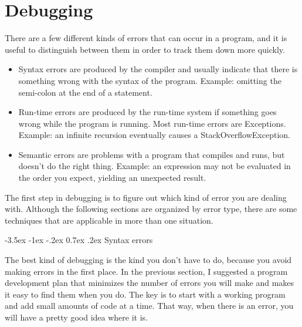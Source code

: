 \documentclass{book}
\makeatletter
\newcounter{exercisenum}
\renewcommand{\section}{\@startsection 
    {section} {1} {0mm}%
    {-3.5ex \@plus -1ex \@minus -.2ex}%
    {0.7ex \@plus.2ex}%
    {\normalfont\Large\bfseries}}
\newcommand{\clearemptydoublepage}{\newpage{\pagestyle{empty}\cleardoublepage}}
\newcommand{\beforechapter}{
    \cleardoublepage 
    \setcounter{exercisenum}{0}
}
\makeatother
\begin{document}
\beforechapter
\chapter{Debugging}
\label{debug}

There are a few different kinds of errors that can occur
in a program, and it is useful to distinguish between them
in order to track them down more quickly.

\begin{itemize}

\item Syntax errors are produced by the compiler and usually
indicate that there is something wrong with the syntax of the
program.  Example: omitting the semi-colon at the end of a
statement.

\item Run-time errors are produced by the run-time system if something
goes wrong while the program is running.  Most run-time errors
are Exceptions.  Example: an infinite recursion eventually causes
a StackOverflowException.

\item Semantic errors are problems with a program that compiles and
runs, but doesn't do the right thing.  Example: an expression may
not be evaluated in the order you expect, yielding an unexpected
result.

\end{itemize}


The first step in debugging is to figure out which kind of
error you are dealing with.  Although the following sections are
organized by error type, there are some techniques that are
applicable in more than one situation.


\section{Syntax errors}

The best kind of debugging is the kind you don't have to do,
because you avoid making errors in the first place.  In the
previous section, I suggested a program development plan that
minimizes the number of errors you will make and makes it easy
to find them when you do.  The key is to start with a working
program and add small amounts of code at a time.  That way,
when there is an error, you will have a pretty good idea where it
is.
\end{document}
